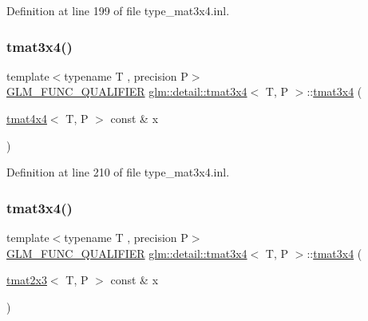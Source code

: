 Definition at line 199 of file type\+\_\+mat3x4.\+inl.

\mbox{\label{structglm_1_1detail_1_1tmat3x4_a4cc12711577c849e0106624fc1f3febe}} 
\subsubsection{\texorpdfstring{tmat3x4()}{tmat3x4()}\hspace{0.1cm}{\footnotesize\ttfamily [13/22]}}
{\footnotesize\ttfamily template$<$typename T , precision P$>$ \\
\hyperlink{setup_8hpp_a33fdea6f91c5f834105f7415e2a64407}{G\+L\+M\+\_\+\+F\+U\+N\+C\+\_\+\+Q\+U\+A\+L\+I\+F\+I\+ER} \hyperlink{structglm_1_1detail_1_1tmat3x4}{glm\+::detail\+::tmat3x4}$<$ T, P $>$\+::\hyperlink{structglm_1_1detail_1_1tmat3x4}{tmat3x4} (\begin{DoxyParamCaption}\item[{\hyperlink{structglm_1_1detail_1_1tmat4x4}{tmat4x4}$<$ T, P $>$ const \&}]{x }\end{DoxyParamCaption})\hspace{0.3cm}{\ttfamily [explicit]}}



Definition at line 210 of file type\+\_\+mat3x4.\+inl.

\mbox{\label{structglm_1_1detail_1_1tmat3x4_a7e69575011350af7e2bed0308f50f0db}} 
\subsubsection{\texorpdfstring{tmat3x4()}{tmat3x4()}\hspace{0.1cm}{\footnotesize\ttfamily [14/22]}}
{\footnotesize\ttfamily template$<$typename T , precision P$>$ \\
\hyperlink{setup_8hpp_a33fdea6f91c5f834105f7415e2a64407}{G\+L\+M\+\_\+\+F\+U\+N\+C\+\_\+\+Q\+U\+A\+L\+I\+F\+I\+ER} \hyperlink{structglm_1_1detail_1_1tmat3x4}{glm\+::detail\+::tmat3x4}$<$ T, P $>$\+::\hyperlink{structglm_1_1detail_1_1tmat3x4}{tmat3x4} (\begin{DoxyParamCaption}\item[{\hyperlink{structglm_1_1detail_1_1tmat2x3}{tmat2x3}$<$ T, P $>$ const \&}]{x }\end{DoxyParamCaption})\hspace{0.3cm}{\ttfamily [explicit]}}



